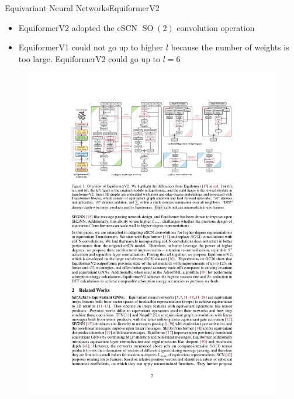 \documentclass[pdf,serif]{beamer}
\begin{document}
\begin{frame}{Equivariant Neural Networks}{EquiformerV2}
    \small
    \begin{itemize}
        \item EquiformerV2 \citep{liao2023equiformerv2} adopted the eSCN $\operatorname{SO}(2)$ convolution operation
        \item EquiformerV1 could not go up to higher $l$ because the number of weights is too large. EquiformerV2 could go up to $l=6$
    \end{itemize}
    \begin{figure}
        \includegraphics[width=\linewidth]{images/eqv2}
    \end{figure}
\end{frame}
\end{document}
